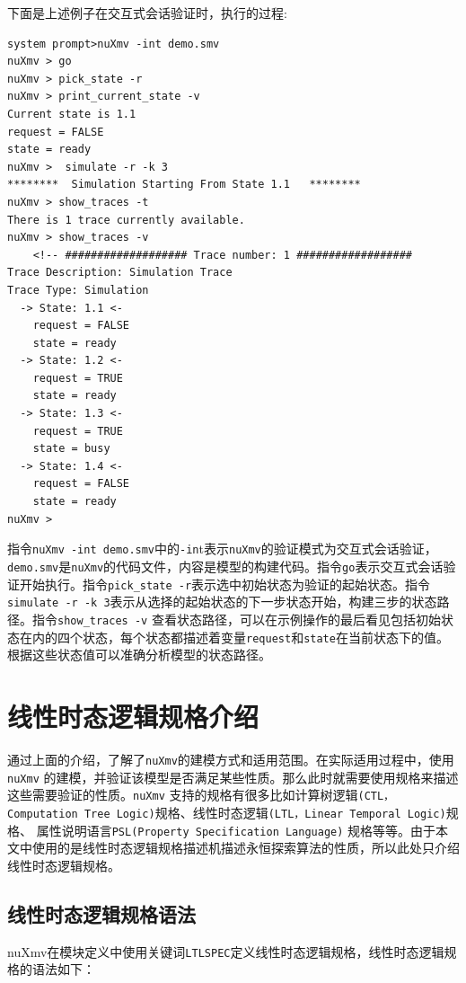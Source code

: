 下面是上述例子在交互式会话验证时，执行的过程:

\begin{lstlisting}
system prompt>nuXmv -int demo.smv
nuXmv > go
nuXmv > pick_state -r
nuXmv > print_current_state -v
Current state is 1.1
request = FALSE
state = ready
nuXmv >  simulate -r -k 3
********  Simulation Starting From State 1.1   ********
nuXmv > show_traces -t
There is 1 trace currently available.
nuXmv > show_traces -v
    <!-- ################### Trace number: 1 ##################
Trace Description: Simulation Trace
Trace Type: Simulation
  -> State: 1.1 <-
    request = FALSE
    state = ready
  -> State: 1.2 <-
    request = TRUE
    state = ready
  -> State: 1.3 <-
    request = TRUE
    state = busy
  -> State: 1.4 <-
    request = FALSE
    state = ready
nuXmv >
\end{lstlisting}

指令\verb|nuXmv -int demo.smv|中的\verb|-in|t表示\verb|nuXmv|的验证模式为交互式会话验证，\verb|demo.smv|是\verb|nuXmv|的代码文件，内容是模型的构建代码。指令\verb|go|表示交互式会话验证开始执行。指令\verb|pick_state -r|表示选中初始状态为验证的起始状态。指令\verb|simulate -r -k 3|表示从选择的起始状态的下一步状态开始，构建三步的状态路径。指令\verb|show_traces -v| 查看状态路径，可以在示例操作的最后看见包括初始状态在内的四个状态，每个状态都描述着变量\verb|request|和\verb|state|在当前状态下的值。根据这些状态值可以准确分析模型的状态路径。

\section{线性时态逻辑规格介绍}
通过上面的介绍，了解了\verb|nuXmv|的建模方式和适用范围。在实际适用过程中，使用\verb|nuXmv| 的建模，并验证该模型是否满足某些性质。那么此时就需要使用规格来描述这些需要验证的性质。\verb|nuXmv| 支持的规格有很多比如计算树逻辑\verb|(CTL，Computation Tree Logic)|规格、线性时态逻辑\verb|(LTL，Linear Temporal Logic)|规格、 属性说明语言\verb|PSL(Property Specification Language)| 规格等等。由于本文中使用的是线性时态逻辑规格描述机描述永恒探索算法的性质，所以此处只介绍线性时态逻辑规格。

\subsection{线性时态逻辑规格语法}

nuXmv在模块定义中使用关键词\verb|LTLSPEC|定义线性时态逻辑规格，线性时态逻辑规格的语法如下：

